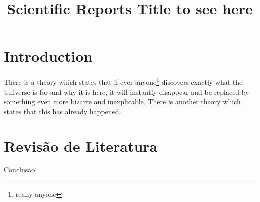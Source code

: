 \documentclass[12pt, a4paper]{article}
\title{Scientific Reports Title to see here}
\begin{document}
\maketitle

\section{Introduction}
There is a theory which states that if ever anyone\footnote{really anyone} discovers exactly what the Universe is for and why it is here, it will instantly disappear and be replaced by something even more bizarre and inexplicable.
There is another theory which states that this has already happened.
\section{Revisão de Literatura}
Conclusao



\end{document}
